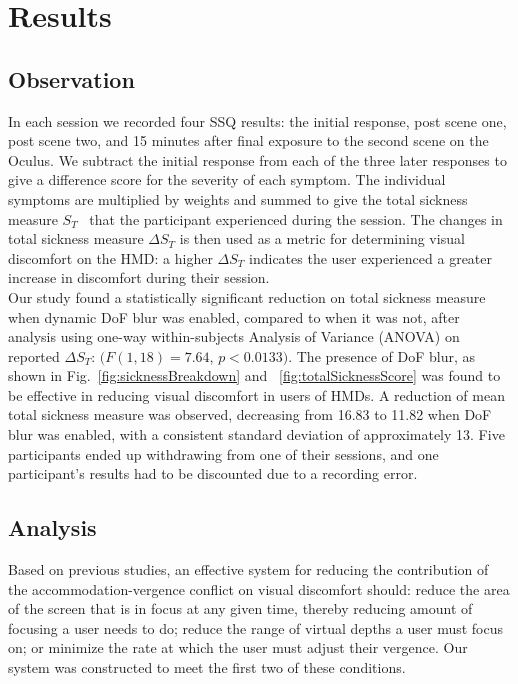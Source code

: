 
\section{Results}

\subsection{Observation}

In each session we recorded four SSQ results: the initial response, post scene one, post scene two, and 15 minutes after final exposure to the second scene on the Oculus. We subtract the initial response from each of the three later responses to give a difference score for the severity of each symptom.  The individual symptoms are multiplied by weights and summed to give the total sickness measure $S_T$~\cite{kennedy93} that the participant experienced during the session. The changes in total sickness measure $\Delta S_T$ is then used as a metric for determining visual discomfort on the HMD: a higher $\Delta S_T$ indicates the user experienced a greater increase in discomfort during their session. \\

Our study found a statistically significant reduction on total sickness measure when dynamic DoF blur was enabled, compared to when it was not, after analysis using one-way within-subjects Analysis of Variance (ANOVA) on reported $\Delta S_T$: $ (F(1,18) = 7.64$, $p < 0.0133)$. 
%
The presence of DoF blur, as shown in Fig.~\ref{fig:sicknessBreakdown} and ~\ref{fig:totalSicknessScore} was found to be effective in reducing visual discomfort in users of HMDs. A reduction of mean total sickness measure was observed, decreasing from 16.83 to 11.82 when DoF blur was enabled, with a consistent standard deviation of approximately 13.
%
Five participants ended up withdrawing from one of their sessions, and one participant's results had to be discounted due to a recording error. \\

\subsection{Analysis}

Based on previous studies, an effective system for reducing the contribution of the accommodation-vergence conflict on visual discomfort should: reduce the area of the screen that is in focus at any given time, thereby reducing amount of focusing a user needs to do; reduce the range of virtual depths a user must focus on; or minimize the rate at which the user must adjust their vergence. Our system was constructed to meet the first two of these conditions.\\

